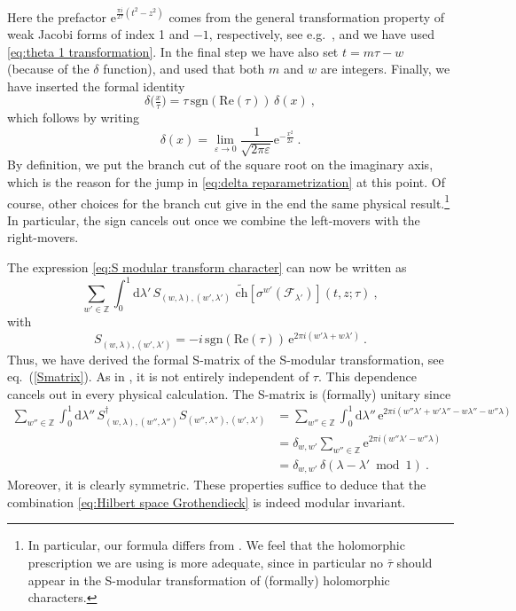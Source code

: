 \documentclass[12pt,a4paper]{article}
\newcommand{\be}{\begin{equation}}
\newcommand{\ee}{\end{equation}}
\begin{document}
Here the prefactor $\mathrm{e}^{\frac{\pi i}{2\tau}(t^2-z^2)}$ comes from the general transformation property of weak Jacobi forms of index 1 and $-1$, respectively, see e.g.\ \cite{Gaberdiel:2012yb}, and we have used \eqref{eq:theta 1 transformation}. In the final step we have also set $t=m\tau -w$ (because of the $\delta$ function), and used that both $m$ and $w$ are integers. Finally, we have inserted the formal identity
\be 
\delta\big(\tfrac{x}{\tau}\big)=\tau\, \mathrm{sgn}(\mathrm{Re}(\tau))\, \delta(x)\ , \label{eq:delta reparametrization}
\ee
which follows by writing
\be 
\delta(x)=\lim_{\varepsilon \to 0} \frac{1}{\sqrt{2\pi \varepsilon}} \mathrm{e}^{-\frac{x^2}{2\varepsilon}}\ .
\ee
By definition, we put the branch cut of the square root on the imaginary axis, which is the reason for the jump in  \eqref{eq:delta reparametrization} at this point. Of course, other choices for the branch cut give in the end the same physical result.\footnote{In particular, our formula differs from \cite{Creutzig:2012sd}. We feel that the holomorphic prescription we are using is more adequate, since in particular no $\bar{\tau}$ should appear in the S-modular transformation of (formally) holomorphic characters.} In particular, the sign cancels out once we combine the left-movers with the right-movers.

The expression \eqref{eq:S modular transform character} can now be written as
\be 
\sum_{w'\in \mathds{Z}} \int_0^1 \mathrm{d}\lambda' \, S_{(w,\lambda),(w',\lambda')}\, \, \tilde{\mathrm{ch}}[\sigma^{w'}(\mathscr{F}_{\lambda'})](t,z;\tau)\ ,
\ee
with
\be 
S_{(w,\lambda),(w',\lambda')}=-i\, \mathrm{sgn}(\mathrm{Re}(\tau)) \, \mathrm{e}^{2\pi i(w'\lambda+w\lambda')}\ .
\ee
Thus, we have derived the formal S-matrix of the S-modular transformation, see eq.~(\ref{Smatrix}).
As in \cite{Creutzig:2012sd}, it is not entirely independent of $\tau$. This dependence cancels out in every physical calculation. The S-matrix is (formally) unitary since
\begin{align} 
\sum_{w''\in \mathds{Z}} \int_0^1 \mathrm{d}\lambda'' \, S^\dag_{(w,\lambda),(w'',\lambda'')} S_{(w'',\lambda''),(w',\lambda')}&=\sum_{w''\in \mathds{Z}} \int_0^1 \mathrm{d}\lambda'' \, \mathrm{e}^{2\pi i (w''\lambda'+w'\lambda''-w \lambda''-w''\lambda)} \\
&=\delta_{w,w'}\sum_{w''\in \mathds{Z}} \mathrm{e}^{2\pi i (w''\lambda'-w''\lambda)}\\
&=\delta_{w,w'}\, \delta(\lambda-\lambda'\bmod 1)\ .
\end{align}
Moreover, it is clearly symmetric. These properties suffice to deduce that the combination \eqref{eq:Hilbert space Grothendieck} is indeed modular invariant.
\end{document}
